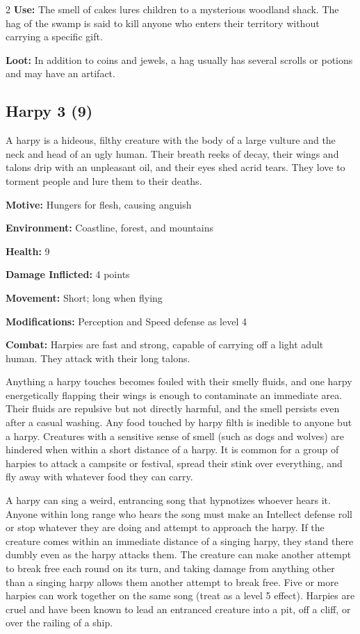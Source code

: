 \begin{multicols}{2}
\textbf{Use:} The smell of cakes lures children to a mysterious woodland shack. The hag of the swamp is said to kill anyone who enters their territory without carrying a specific gift. 

\textbf{Loot:} In addition to coins and jewels, a hag usually has several scrolls or potions and may have an artifact.

\subsection{Harpy 3 (9)}

A harpy is a hideous, filthy creature with the body of a large vulture and the neck and head of an ugly human. Their breath reeks of decay, their wings and talons drip with an unpleasant oil, and their eyes shed acrid tears. They love to torment people and lure them to their deaths. 

\textbf{Motive:} Hungers for flesh, causing anguish 

\textbf{Environment:} Coastline, forest, and mountains 

\textbf{Health:} 9 

\textbf{Damage Inflicted:} 4 points 

\textbf{Movement:} Short; long when flying 

\textbf{Modifications:} Perception and Speed defense as level 4 

\textbf{Combat:} Harpies are fast and strong, capable of carrying off a light adult human. They attack with their long talons. 

Anything a harpy touches becomes fouled with their smelly fluids, and one harpy energetically flapping their wings is enough to contaminate an immediate area. Their fluids are repulsive but not directly harmful, and the smell persists even after a casual washing. Any food touched by harpy filth is inedible to anyone but a harpy. Creatures with a sensitive sense of smell (such as dogs and wolves) are hindered when within a short distance of a harpy. It is common for a group of harpies to attack a campsite or festival, spread their stink over everything, and fly away with whatever food they can carry.

A harpy can sing a weird, entrancing song that hypnotizes whoever hears it. Anyone within long range who hears the song must make an Intellect defense roll or stop whatever they are doing and attempt to approach the harpy. If the creature comes within an immediate distance of a singing harpy, they stand there dumbly even as the harpy attacks them. The creature can make another attempt to break free each round on its turn, and taking damage from anything other than a singing harpy allows them another attempt to break free. Five or more harpies can work together on the same song (treat as a level 5 effect). Harpies are cruel and have been known to lead an entranced creature into a pit, off a cliff, or over the railing of a ship. 


\end{multicols}
